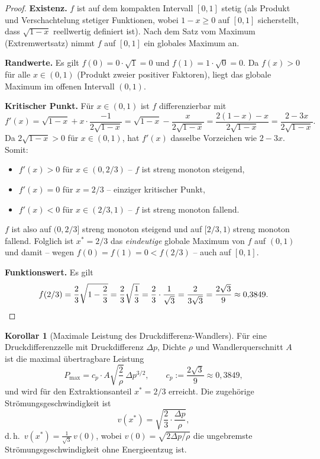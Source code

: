 ﻿\documentclass[a4paper,12pt]{article}
\theoremstyle{definition}
\newtheorem{korollar}{Korollar}
\begin{document}
\begin{proof}
	\textbf{Existenz.} $f$ ist auf dem kompakten Intervall $[0,1]$ stetig
	(als Produkt und Verschachtelung stetiger Funktionen, wobei
	$1-x \geq 0$ auf $[0,1]$ sicherstellt, dass $\sqrt{1-x}$ reellwertig
	definiert ist). Nach dem Satz vom Maximum (Extremwertsatz) nimmt $f$
	auf $[0,1]$ ein globales Maximum an.

	\textbf{Randwerte.} Es gilt $f(0) = 0 \cdot \sqrt{1} = 0$ und
	$f(1) = 1 \cdot \sqrt{0} = 0$. Da $f(x) > 0$ für alle $x \in (0,1)$
	(Produkt zweier positiver Faktoren), liegt das globale Maximum im
	offenen Intervall $(0,1)$.

	\textbf{Kritischer Punkt.} Für $x \in (0,1)$ ist $f$ differenzierbar
	mit
	\[
		f'(x) = \sqrt{1-x} + x \cdot \frac{-1}{2\sqrt{1-x}}
		= \sqrt{1-x} - \frac{x}{2\sqrt{1-x}}
		= \frac{2(1-x) - x}{2\sqrt{1-x}}
		= \frac{2 - 3x}{2\sqrt{1-x}}.
	\]
	Da $2\sqrt{1-x} > 0$ für $x \in (0,1)$, hat $f'(x)$ dasselbe
	Vorzeichen wie $2-3x$. Somit:
	\begin{itemize}
		\item $f'(x) > 0$ für $x \in (0, 2/3)$ -- $f$ ist streng
		monoton steigend,
		\item $f'(x) = 0$ für $x = 2/3$ -- einziger kritischer Punkt,
		\item $f'(x) < 0$ für $x \in (2/3, 1)$ -- $f$ ist streng
		monoton fallend.
	\end{itemize}
	$f$ ist also auf $(0, 2/3]$ streng monoton steigend und auf
	$[2/3, 1)$ streng monoton fallend. Folglich ist $x^\ast = 2/3$ das
	\emph{eindeutige} globale Maximum von $f$ auf $(0,1)$ und damit --
	wegen $f(0)=f(1)=0 < f(2/3)$ -- auch auf $[0,1]$.

	\textbf{Funktionswert.} Es gilt
	\[
		f(2/3) = \frac{2}{3}\sqrt{1 - \frac{2}{3}}
		= \frac{2}{3}\sqrt{\frac{1}{3}}
		= \frac{2}{3} \cdot \frac{1}{\sqrt{3}}
		= \frac{2}{3\sqrt{3}}
		= \frac{2\sqrt{3}}{9} \approx 0{,}3849. \qedhere
	\]
\end{proof}

\begin{korollar}[Maximale Leistung des Druckdifferenz-Wandlers]
	\label{kor:pmax}
	Für eine Druckdifferenzzelle mit Druckdifferenz $\Delta p$, Dichte
	$\rho$ und Wandlerquerschnitt $A$ ist die maximal übertragbare
	Leistung
	\begin{equation}
		\label{eq:pmax}
		P_{\max} = c_p \cdot A \sqrt{\frac{2}{\rho}}\, \Delta p^{3/2},
		\qquad c_p := \frac{2\sqrt{3}}{9} \approx 0{,}3849,
	\end{equation}
	und wird für den Extraktionsanteil $x^\ast = 2/3$ erreicht. Die
	zugehörige Strömungsgeschwindigkeit ist
	\[
		v(x^\ast) = \sqrt{\frac{2}{3}\cdot\frac{\Delta p}{\rho}},
	\]
	d.\,h.\ $v(x^\ast) = \tfrac{1}{\sqrt{3}}\, v(0)$, wobei
	$v(0) = \sqrt{2\Delta p/\rho}$ die ungebremste
	Strömungsgeschwindigkeit ohne Energieentzug ist.
\end{korollar}
\end{document}
